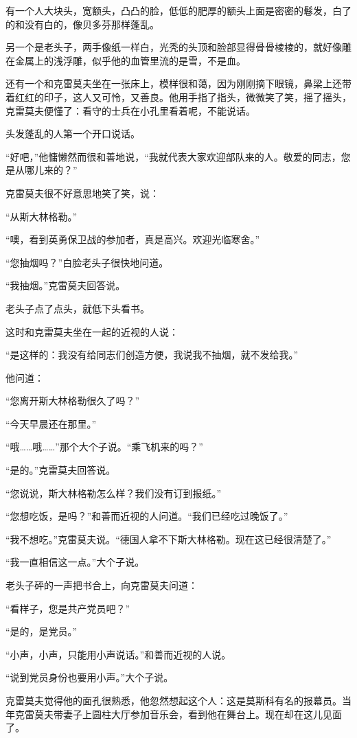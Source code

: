 有一个人大块头，宽额头，凸凸的脸，低低的肥厚的额头上面是密密的鬈发，白了的和没有白的，像贝多芬那样蓬乱。

另一个是老头子，两手像纸一样白，光秃的头顶和脸部显得骨骨棱棱的，就好像雕在金属上的浅浮雕，似乎他的血管里流的是雪，不是血。

还有一个和克雷莫夫坐在一张床上，模样很和蔼，因为刚刚摘下眼镜，鼻梁上还带着红红的印子，这人又可怜，又善良。他用手指了指头，微微笑了笑，摇了摇头，克雷莫夫便懂了：看守的士兵在小孔里看着呢，不能说话。

头发蓬乱的人第一个开口说话。

“好吧，”他慵懒然而很和善地说，“我就代表大家欢迎部队来的人。敬爱的同志，您是从哪儿来的？”

克雷莫夫很不好意思地笑了笑，说：

“从斯大林格勒。”

“噢，看到英勇保卫战的参加者，真是高兴。欢迎光临寒舍。”

“您抽烟吗？”白脸老头子很快地问道。

“我抽烟。”克雷莫夫回答说。

老头子点了点头，就低下头看书。

这时和克雷莫夫坐在一起的近视的人说：

“是这样的：我没有给同志们创造方便，我说我不抽烟，就不发给我。”

他问道：

“您离开斯大林格勒很久了吗？”

“今天早晨还在那里。”

“哦……哦……”那个大个子说。“乘飞机来的吗？”

“是的。”克雷莫夫回答说。

“您说说，斯大林格勒怎么样？我们没有订到报纸。”

“您想吃饭，是吗？”和善而近视的人问道。“我们已经吃过晚饭了。”

“我不想吃。”克雷莫夫说。“德国人拿不下斯大林格勒。现在这已经很清楚了。”

“我一直相信这一点。”大个子说。

老头子砰的一声把书合上，向克雷莫夫问道：

“看样子，您是共产党员吧？”

“是的，是党员。”

“小声，小声，只能用小声说话。”和善而近视的人说。

“说到党员身份也要用小声。”大个子说。

克雷莫夫觉得他的面孔很熟悉，他忽然想起这个人：这是莫斯科有名的报幕员。当年克雷莫夫带妻子上圆柱大厅参加音乐会，看到他在舞台上。现在却在这儿见面了。

